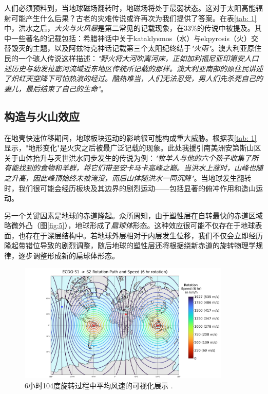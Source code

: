 \documentclass[10pt,twocolumn,letterpaper]{article}
\begin{document}
人们必须预料到，当地球磁场翻转时，地磁场将处于最弱状态。这对于太阳高能辐射可能产生什么后果？古老的灾难传说或许再次为我们提供了答案。在表\ref{tab: 1}中，洪水之后，\textit{大火与火风暴}是第二常见的记载现象，在33\%的传说中被提及。其中一些著名的记载包括：希腊神话中关于kataklysmos（水）与ekpyrosis（火）交替毁灭的主题\cite{13}，以及阿兹特克神话记载第三个太阳纪终结于\textit{"火雨"}\cite{14}。澳大利亚原住民的一个骇人传说这样描述：\textit{"野火将大河吹离河床，正如加利福尼亚印第安人口述历史与幼发拉底河流域近东地区传统所记载的那样。澳大利亚南部的原住民讲述了炽红天空降下可怕热浪的经过。酷热难当，人们无法忍受，男人们先杀死自己的妻儿，最后结束了自己的生命"}\cite{15}。

\subsection{构造与火山效应}
在地壳快速位移期间，地球板块运动的影响很可能构成重大威胁。根据表\ref{tab: 1}显示，"地形变化"是火灾之后被最广泛记载的现象。此处我援引南美洲安第斯山区关于山体抬升与灭世洪水同步发生的传说为例：\textit{"牧羊人与他的六个孩子收集了所有能找到的食物和羊群，将它们带至安卡马卡高峰之巅。当洪水上涨时，山峰也随之升高，因此峰顶始终未被淹没，而后山体随洪水一同沉降"}\cite{17}。当地球发生翻转时，我们很可能会经历板块及其边界的剧烈运动——包括显著的俯冲作用和造山运动。

另一个关键因素是地球的赤道隆起。众所周知，由于塑性层在自转最快的赤道区域略微外凸（图\ref{fig:5}），地球形成了\textit{扁球体}形态。这种效应很可能不仅存在于地球表面，也存在于深层结构中。若地球外层相对于内层发生位移，我们不仅会立即经历隆起带错位导致的剧烈调整，随后地球的塑性层还将根据绕新赤道的旋转物理学规律，逐步调整形成新的扁球体形态。
\begin{figure}[t]
\begin{center}
\includegraphics[width=0.9\textwidth]{rotate2.png}
\end{center}
   \caption{6小时104度旋转过程中平均风速的可视化展示 \cite{2}.}
   \label{fig:6}
\end{figure}
\end{document}
